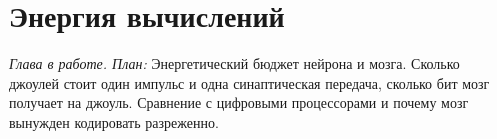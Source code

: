 \chapter{Энергия вычислений}
\label{sec:energy}

\emph{Глава в работе. План:} Энергетический бюджет нейрона и мозга. Сколько джоулей стоит один импульс и одна синаптическая передача, сколько бит мозг получает на джоуль. Сравнение с цифровыми процессорами и почему мозг вынужден кодировать разреженно.
